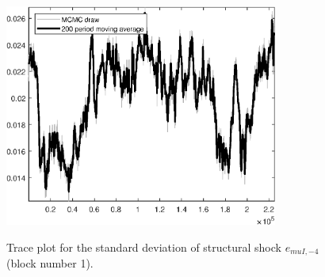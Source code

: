 \begin{figure}[H]
\centering
  \includegraphics[width=0.8\textwidth]{BRS_sectoral/graphs/TracePlot_SE_e_muI_news_blck_1}\\
    \caption{Trace plot for the standard deviation of structural shock ${e_{muI,-4}}$ (block number 1).}
\end{figure}
